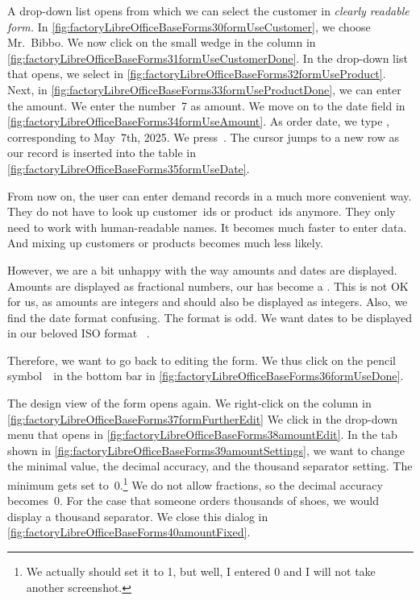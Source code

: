 A drop-down list opens from which we can select the customer in \emph{clearly readable form.} %
In \cref{fig:factoryLibreOfficeBaseForms30formUseCustomer}, we choose Mr.~Bibbo.
We now click on the small wedge in the  column in \cref{fig:factoryLibreOfficeBaseForms31formUseCustomerDone}.
In the drop-down list that opens, we select  in \cref{fig:factoryLibreOfficeBaseForms32formUseProduct}.
Next, in \cref{fig:factoryLibreOfficeBaseForms33formUseProductDone}, we can enter the amount.
We enter the number~7 as amount.
We move on to the  date field in \cref{fig:factoryLibreOfficeBaseForms34formUseAmount}.
As order date, we type , corresponding to May~7th, 2025.
We press~\keys{\tab}.
The cursor jumps to a new row as our record is inserted into the  table in \cref{fig:factoryLibreOfficeBaseForms35formUseDate}.

From now on, the user can enter demand records in a much more convenient way.
They do not have to look up customer~ids or product~ids anymore.
They only need to work with human-readable names.
It becomes much faster to enter data.
And mixing up customers or products becomes much less likely.

However, we are a bit unhappy with the way amounts and dates are displayed.
Amounts are displayed as fractional numbers, our  has become a .
This is not OK for us, as amounts are integers and should also be displayed as integers.
Also, we find the date format confusing.
The  format is odd.
We want dates to be displayed in our beloved ISO format ~\cite{ISO860112019}.

Therefore, we want to go back to editing the form.
We thus click on the pencil symbol~\libreOfficeBaseDesignMode\ in the bottom bar in \cref{fig:factoryLibreOfficeBaseForms36formUseDone}.

The design view of the form opens again.
We right-click on the  column in \cref{fig:factoryLibreOfficeBaseForms37formFurtherEdit}
We click  in the drop-down menu that opens in \cref{fig:factoryLibreOfficeBaseForms38amountEdit}.
In the  tab shown in \cref{fig:factoryLibreOfficeBaseForms39amountSettings}, we want to change the minimal value, the decimal accuracy, and the thousand separator setting.
The minimum gets set to~0.\footnote{%
We actually should set it to 1, but well, I entered 0 and I will not take another screenshot.}
We do not allow fractions, so the decimal accuracy becomes~0.
For the case that someone orders thousands of shoes, we would display a thousand separator.
We close this dialog in \cref{fig:factoryLibreOfficeBaseForms40amountFixed}.

